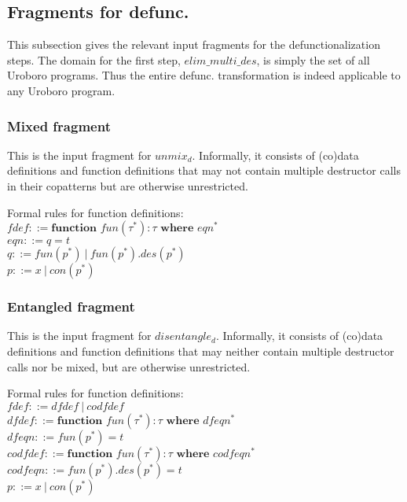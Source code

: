 \documentclass[11pt]{article} %
\begin{document}
\subsection{Fragments for defunc.}

This subsection gives the relevant input fragments for the defunctionalization steps. The domain for the first step, $elim\_multi\_des$, is simply the set of all Uroboro programs. Thus the entire defunc. transformation is indeed applicable to any Uroboro program.

\subsubsection{Mixed fragment}

This is the input fragment for $unmix_d$. Informally, it consists of (co)data definitions and function definitions that may not contain multiple destructor calls in their copatterns but are otherwise unrestricted. 

Formal rules for function definitions:\\
$fdef ::= \textbf{function } fun(\tau^*): \tau \textbf{ where } eqn^*$\\
$eqn ::= q = t$\\
$q ::= fun(p^*) ~ | ~ fun(p^*).des(p^*)$\\
$p ::= x ~ | ~ con(p^*) $\\

\subsubsection{Entangled fragment}

This is the input fragment for $disentangle_d$. Informally, it consists of (co)data definitions and function definitions that may neither contain multiple destructor calls nor be mixed, but are otherwise unrestricted.

Formal rules for function definitions:\\
$fdef ::= dfdef ~ | ~ codfdef$\\
$dfdef ::= \textbf{function } fun(\tau^*): \tau \textbf{ where } dfeqn^*$\\
$dfeqn ::= fun(p^*) = t$\\
$codfdef ::= \textbf{function } fun(\tau^*): \tau \textbf{ where } codfeqn^*$\\
$codfeqn ::= fun(p^*).des(p^*) = t$\\
$p ::= x ~ | ~ con(p^*) $\\
\end{document}

